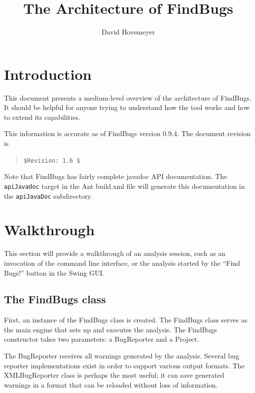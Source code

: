 \documentclass[11pt]{article}
\title{The Architecture of FindBugs}
\author{David Hovemeyer}
\date{}
\begin{document}
\maketitle
\tableofcontents

\section*{Introduction}

This document presents a medium-level overview of the architecture
of FindBugs.  It should be helpful for anyone trying to understand how
the tool works and how to extend its capabilities.

This information is accurate as of FindBugs version 0.9.4.
The document revision is
\begin{quote}
\verb+$Revision: 1.6 $+
\end{quote}

Note that FindBugs has fairly complete javadoc API documentation.
The {\tt apiJavadoc} target in the Ant build.xml file will generate
this documentation in the {\tt apiJavaDoc} subdirectory.

\section{Walkthrough}

This section will provide a walkthrough of an analysis session,
such as an invocation of the command line interface, or the analysis
started by the ``Find Bugs!'' button in the Swing GUI.

\subsection{The FindBugs class}


First, an instance of the FindBugs class is created.
The FindBugs class serves as the main engine that sets up and executes the
analysis.  The FindBugs constructor takes
two parameters: a BugReporter and a Project.

The BugReporter receives all warnings generated by the analysis.
Several bug reporter implementations exist in order to support various
output formats.  The XMLBugReporter class is perhaps the most useful;
it can save generated warnings in a format that can be reloaded without
loss of information.  
\end{document}
